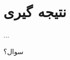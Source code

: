 

\section{نتیجه گیری}

\begin{frame}{...}

  \begin{center}\ccbysa\end{center}

\end{frame}

\begin{frame}[standout]
  سوال؟
\end{frame}



